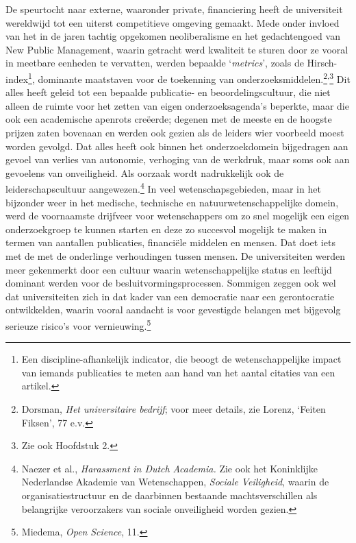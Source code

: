 \documentclass[smallauthor, chapterhaspagenum, nochapterinheader, pagenuminheader,  bigchapnum,medium2, tocpages, garamond, titleinheader]{jote-book}
\begin{document}
	De speurtocht naar externe, waaronder private, financiering heeft de universiteit wereldwijd tot een uiterst competitieve omgeving gemaakt. Mede onder invloed van het in de jaren tachtig opgekomen neoliberalisme en het gedachtengoed van New Public Management, waarin getracht werd kwaliteit te sturen door ze vooral in meetbare eenheden te vervatten, werden bepaalde ‘\emph{metrics}', zoals de Hirsch-index\footnote{Een discipline-afhankelijk indicator, die beoogt de wetenschappelijke impact van iemands publicaties te meten aan hand van het aantal citaties van een artikel. }, dominante maatstaven voor de toekenning van onderzoeksmiddelen.\footnote{Dorsman, \emph{Het universitaire bedrijf}; voor meer details, zie Lorenz, ‘Feiten Fiksen', 77 e.v.}\textsuperscript{,}\footnote{Zie ook Hoofdstuk 2.} Dit alles heeft geleid tot een bepaalde publicatie- en beoordelingscultuur, die niet alleen de ruimte voor het zetten van eigen onderzoeksagenda's beperkte, maar die ook een academische apenrots creëerde; degenen met de meeste en de hoogste prijzen zaten bovenaan en werden ook gezien als de leiders wier voorbeeld moest worden gevolgd. Dat alles heeft ook binnen het onderzoekdomein bijgedragen aan gevoel van verlies van autonomie, verhoging van de werkdruk, maar soms ook aan gevoelens van onveiligheid. Als oorzaak wordt nadrukkelijk ook de leiderschapscultuur aangewezen.\footnote{Naezer et al., \emph{Harassment}\emph{ in Dutch }\emph{Academia}\emph{.} Zie ook het Koninklijke Nederlandse Akademie van Wetenschappen, \emph{Sociale}\emph{ Veiligheid}, waarin de organisatiestructuur en de daarbinnen bestaande machtsverschillen als belangrijke veroorzakers van sociale onveiligheid worden gezien.} In veel wetenschapsgebieden, maar in het bijzonder weer in het medische, technische en natuurwetenschappelijke domein, werd de voornaamste drijfveer voor wetenschappers om zo snel mogelijk een eigen onderzoekgroep te kunnen starten en deze zo succesvol mogelijk te maken in termen van aantallen publicaties, financiële middelen en mensen. Dat doet iets met de met de onderlinge verhoudingen tussen mensen. De universiteiten werden meer gekenmerkt door een cultuur waarin wetenschappelijke status en leeftijd dominant werden voor de besluitvormingsprocessen. Sommigen zeggen ook wel dat universiteiten zich in dat kader van een democratie naar een gerontocratie ontwikkelden, waarin vooral aandacht is voor gevestigde belangen met bijgevolg serieuze risico's voor vernieuwing.\footnote{Miedema, \emph{Open }\emph{Science}, 11.}
\end{document}
